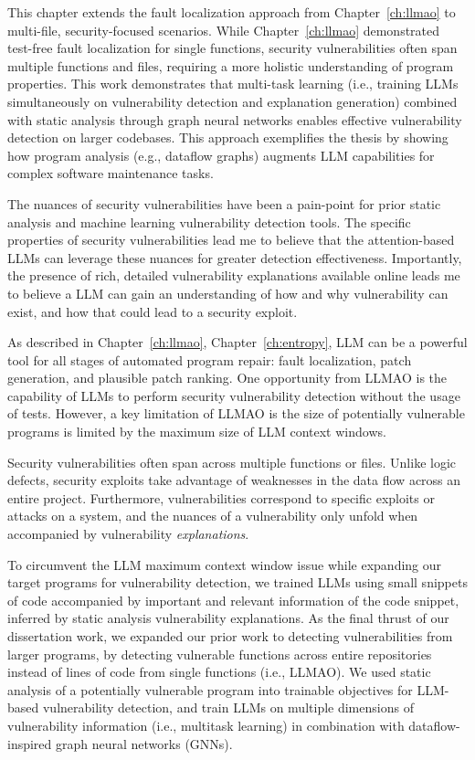 \documentclass[12pt,openany,oneside,table]{cmuthesis}
\begin{document}
This chapter extends the fault localization approach from Chapter~\ref{ch:llmao} to multi-file, security-focused scenarios. While Chapter~\ref{ch:llmao} demonstrated test-free fault localization for single functions, security vulnerabilities often span multiple functions and files, requiring a more holistic understanding of program properties. This work demonstrates that multi-task learning (i.e., training LLMs simultaneously on vulnerability detection and explanation generation) combined with static analysis through graph neural networks enables effective vulnerability detection on larger codebases. This approach exemplifies the thesis by showing how program analysis (e.g., dataflow graphs) augments LLM capabilities for complex software maintenance tasks.

The nuances of security vulnerabilities have been a pain-point for prior static analysis and machine learning vulnerability detection tools. The specific properties of security vulnerabilities lead me to believe that the attention-based LLMs can leverage these nuances for greater detection effectiveness. Importantly, the presence of rich, detailed vulnerability explanations available online leads me to believe a LLM can gain an understanding of how and why vulnerability can exist, and how that could lead to a security exploit. 

As described in Chapter~\ref{ch:llmao}, Chapter~\ref{ch:entropy}, LLM can be a powerful tool for all stages of automated program repair: fault localization, patch generation, and plausible patch ranking. One opportunity from LLMAO is the capability of LLMs to perform security vulnerability detection without the usage of tests. 
However, a key limitation of LLMAO is the size of potentially vulnerable programs is limited by the maximum size of LLM context windows.

Security vulnerabilities often span across multiple functions or files. Unlike logic defects, security exploits take advantage of weaknesses in the data flow across an entire project. Furthermore, vulnerabilities correspond to specific exploits or attacks on a system, and the nuances of a vulnerability only unfold when accompanied by vulnerability \textit{explanations}.

To circumvent the LLM maximum context window issue while expanding our target programs for vulnerability detection, we trained LLMs using small snippets of code accompanied by important and relevant information of the code snippet, inferred by static analysis vulnerability explanations. As the final thrust of our dissertation work, we expanded our prior work to detecting vulnerabilities from larger programs, by detecting vulnerable functions across entire repositories instead of lines of code from single functions (i.e., LLMAO). We used static analysis of a potentially vulnerable program into trainable objectives for LLM-based vulnerability detection, and train LLMs on multiple dimensions of vulnerability information (i.e., multitask learning) in combination with dataflow-inspired graph neural networks (GNNs). 
\end{document}
